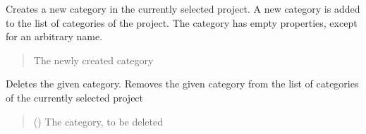 \documentclass[letterpaper,10pt,english]{sphinxmanual}
\begin{document}
\begin{fulllineitems}
\begin{fulllineitems}
\begin{quote}
\begin{description}
\end{description}\end{quote}

\end{fulllineitems}


\begin{fulllineitems}
\label{\detokenize{apidoc/src.osm_configurator.control:src.osm_configurator.control.category_controller.CategoryController.create_category}}
\pysigstartsignatures
{}
\pysigstopsignatures
\sphinxAtStartPar
Creates a new category in the currently selected project.
A new category is added to the list of categories of the project. The category has empty properties, except for an arbitrary name.
\begin{quote}\begin{description}
\sphinxAtStartPar
The newly created category

\sphinxAtStartPar
{\hyperref[\detokenize{apidoc/src.osm_configurator.model.project.configuration:src.osm_configurator.model.project.configuration.category.Category}]{}}

\end{description}\end{quote}

\end{fulllineitems}


\begin{fulllineitems}
\label{\detokenize{apidoc/src.osm_configurator.control:src.osm_configurator.control.category_controller.CategoryController.delete_category}}
\pysigstartsignatures
{}
\pysigstopsignatures
\sphinxAtStartPar
Deletes the given category.
Removes the given category from the list of categories of the currently selected project
\begin{quote}\begin{description}
\sphinxAtStartPar
{} ({\hyperref[\detokenize{apidoc/src.osm_configurator.model.project.configuration:src.osm_configurator.model.project.configuration.category.Category}]{}}) \textendash{} The category, to be deleted


\end{description}
\end{quote}
\end{fulllineitems}
\end{fulllineitems}
\end{document}
